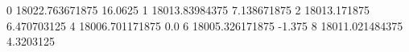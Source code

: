 0 18022.763671875 16.0625
1 18013.83984375 7.138671875
2 18013.171875 6.470703125
4 18006.701171875 0.0
6 18005.326171875 -1.375
8 18011.021484375 4.3203125
